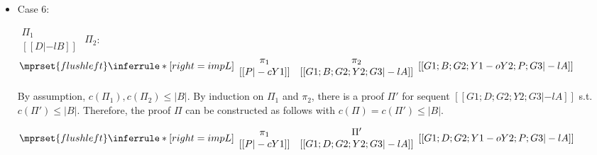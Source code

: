 \begin{itemize}
\item Case 6:
      \begin{center}
        \scriptsize
        \begin{math}
          \begin{array}{c}
            \Pi_1 \\
            {[[D |-l B]]}
          \end{array}
        \end{math}
        \qquad\qquad
        $\Pi_2$:
        \begin{math}
          $$\mprset{flushleft}
          \inferrule* [right={\tiny impL}] {
            {
              \begin{array}{cc}
                \pi_1 & \pi_2 \\
                {[[P |-c Y1]]} & {[[G1; B; G2; Y2; G3 |-l A]]}
              \end{array}
            }
          }{[[G1; B; G2; Y1 -o Y2; P; G3 |-l A]]}
        \end{math}
      \end{center}
      By assumption, $c(\Pi_1),c(\Pi_2)\leq |B|$. By induction on $\Pi_1$
      and $\pi_2$, there is a proof $\Pi'$ for sequent
      $[[G1; D; G2; Y2; G3 |-l A]]$ s.t. $c(\Pi') \leq |B|$. Therefore, the
      proof $\Pi$ can be constructed as follows with
      $c(\Pi) = c(\Pi') \leq |B|$.
      \begin{center}
        \scriptsize
        \begin{math}
          $$\mprset{flushleft}
          \inferrule* [right={\tiny impL}] {
            {
              \begin{array}{cc}
                \pi_1 & \Pi' \\
                {[[P |-c Y1]]} & {[[G1; D; G2; Y2; G3 |-l A]]}
              \end{array}
            }
          }{[[G1; D; G2; Y1 -o Y2; P; G3 |-l A]]}
        \end{math}
      \end{center}


\end{itemize}
